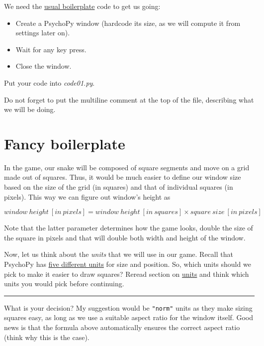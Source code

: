 \documentclass[
]{book}
\providecommand{\tightlist}{%
  \setlength{\itemsep}{0pt}\setlength{\parskip}{0pt}}
\begin{document}
We need the \protect\hyperlink{psychopy-basics}{usual boilerplate} code to get us going:

\begin{itemize}
\tightlist
\item
  Create a PsychoPy window (hardcode its size, as we will compute it from settings later on).
\item
  Wait for any key press.
\item
  Close the window.
\end{itemize}

Put your code into \emph{code01.py}.

Do not forget to put the multiline comment at the top of the file, describing what we will be doing.

\hypertarget{fancy-boilerplate}{%
\section{Fancy boilerplate}\label{fancy-boilerplate}}

In the game, our snake will be composed of square segments and move on a grid made out of squares. Thus, it would be much easier to define our window size based on the size of the grid (in squares) and that of individual squares (in pixels). This way we can figure out window's height as

\[window~height~[in~pixels] = window~height~[in~squares] \times square~size~[in~pixels]\]

Note that the latter parameter determines how the game looks, double the size of the square in pixels and that will double both width and height of the window.

Now, let us think about the \emph{units} that we will use in our game. Recall that PsychoPy has \protect\hyperlink{psychopy-units}{five different units} for size and position. So, which units should we pick to make it easier to draw squares? Reread section on \protect\hyperlink{psychopy-units}{units} and think which units you would pick before continuing.

\begin{center}\rule{0.5\linewidth}{0.5pt}\end{center}

What is your decision? My suggestion would be \texttt{"norm"} units as they make sizing squares easy, as long as we use a suitable aspect ratio for the window itself. Good news is that the formula above automatically ensures the correct aspect ratio (think why this is the case).
\end{document}
